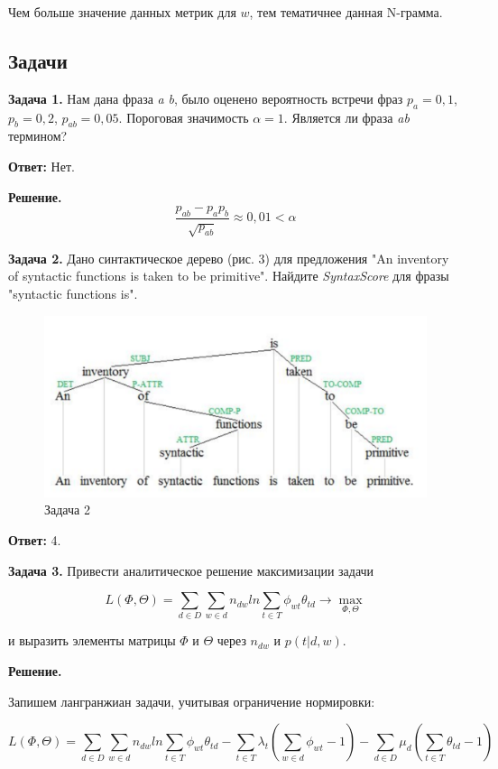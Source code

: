 Чем больше значение данных метрик для $w$, тем тематичнее данная N-грамма.

\subsection*{Задачи}

\textbf{Задача 1.} Нам дана фраза \textit{a} \textit{b}, было оценено вероятность встречи фраз $p_{a} = 0,1$, $p_{b} = 0,2$, $p_{ab} = 0,05$. Пороговая значимость $\alpha = 1$. Является ли фраза \textit{ab} термином?

\textbf{Ответ:} Нет.

\textbf{Решение.} 
$$\frac{p_{ab}-p_{a}p_{b}}{\sqrt{p_{ab}}} \approx 0,01 < \alpha$$

 \textbf{Задача 2.} Дано синтактическое дерево (рис. 3) для предложения "An inventory of syntactic functions is taken to be primitive". Найдите \textit{SyntaxScore} для фразы "syntactic functions is".
 
\begin{figure}
    \includegraphics[scale = 0.4]{chapters/rules/images/ml3.png}
    \caption{Задача 2}
\end{figure}

\textbf{Ответ:} 4.

\textbf{Задача 3.} Привести аналитическое решение максимизации задачи

$$L(\Phi, \Theta) = \sum_{d \in D} \sum_{w \in d} n_{dw} ln \sum_{t \in T} \phi_{wt} \theta_{td} \rightarrow \max_{\Phi, \Theta}$$

и выразить элементы матрицы $\Phi$ и $\Theta$ через $n_{dw}$ и $p(t|d,w)$.

\textbf{Решение.}

Запишем лангранжиан задачи, учитывая ограничение нормировки:

$$L(\Phi, \Theta) = \sum_{d \in D} \sum_{w \in d} n_{dw} ln \sum_{t \in T} \phi_{wt} \theta_{td} - \sum_{t \in T} \lambda_{t} (\sum_{w \in d} \phi_{wt} - 1) - \sum_{d \in D} \mu_{d} (\sum_{t \in T} \theta_{td} - 1)$$

